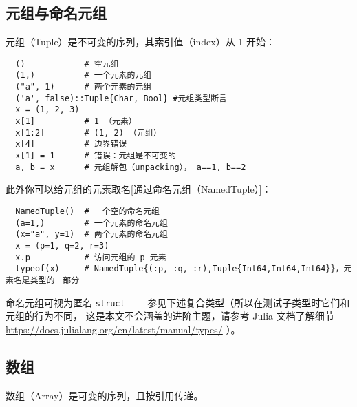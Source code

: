 \documentclass[10pt,a4paper]{article}
\begin{document}
\subsection{元组与命名元组}
元组（Tuple）是不可变的序列，其索引值（index）从 1 开始：
\begin{lstlisting}
  ()            # 空元组
  (1,)          # 一个元素的元组
  ("a", 1)      # 两个元素的元组
  ('a', false)::Tuple{Char, Bool} #元组类型断言
  x = (1, 2, 3)
  x[1]          # 1 （元素）
  x[1:2]        # (1, 2) （元组）
  x[4]          # 边界错误
  x[1] = 1      # 错误：元组是不可变的
  a, b = x      # 元组解包（unpacking）， a==1, b==2
\end{lstlisting}
此外你可以给元组的元素取名[通过命名元组（NamedTuple）]：
\begin{lstlisting}
  NamedTuple()  # 一个空的命名元组
  (a=1,)        # 一个元素的命名元组
  (x="a", y=1)  # 两个元素的命名元组
  x = (p=1, q=2, r=3)
  x.p           # 访问元组的 p 元素
  typeof(x)     # NamedTuple{(:p, :q, :r),Tuple{Int64,Int64,Int64}}，元素名是类型的一部分
\end{lstlisting}
命名元组可视为匿名 \lstinline|struct| ——参见下述复合类型（所以在测试子类型时它们和元组的行为不同，
这是本文不会涵盖的进阶主题，请参考 Julia 文档了解细节 \sloppy   \url{https://docs.julialang.org/en/latest/manual/types/} ）。

\subsection{数组}
数组（Array）是可变的序列，且按引用传递。
\end{document}

